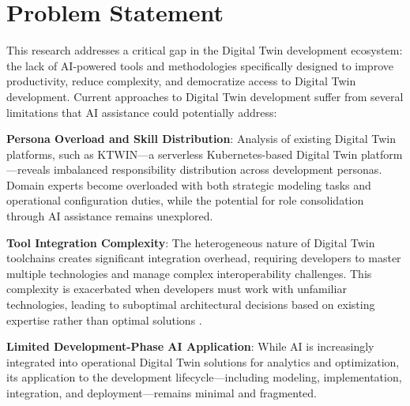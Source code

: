 \section{Problem Statement}

This research addresses a critical gap in the Digital Twin development ecosystem: the lack of AI-powered tools and methodologies specifically designed to improve productivity, reduce complexity, and democratize access to Digital Twin development. Current approaches to Digital Twin development suffer from several limitations that AI assistance could potentially address:

\textbf{Persona Overload and Skill Distribution}: Analysis of existing Digital Twin platforms, such as KTWIN—a serverless Kubernetes-based Digital Twin platform \cite{ktwin}—reveals imbalanced responsibility distribution across development personas. Domain experts become overloaded with both strategic modeling tasks and operational configuration duties, while the potential for role consolidation through AI assistance remains unexplored.

\textbf{Tool Integration Complexity}: The heterogeneous nature of Digital Twin toolchains creates significant integration overhead, requiring developers to master multiple technologies and manage complex interoperability challenges. This complexity is exacerbated when developers must work with unfamiliar technologies, leading to suboptimal architectural decisions based on existing expertise rather than optimal solutions \cite{interview_study}.

\textbf{Limited Development-Phase AI Application}: While AI is increasingly integrated into operational Digital Twin solutions for analytics and optimization, its application to the development lifecycle—including modeling, implementation, integration, and deployment—remains minimal and fragmented.

